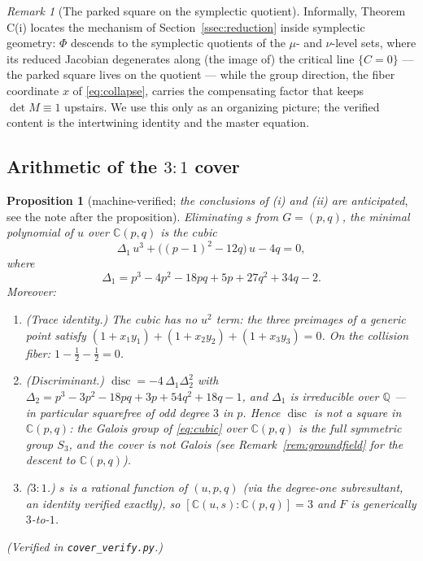 \documentclass[11pt]{amsart}
\newcommand{\CC}{\mathbb{C}}
\newcommand{\QQ}{\mathbb{Q}}
\newcommand{\disc}{\operatorname{disc}}
\theoremstyle{plain}
\newtheorem{proposition}[theorem]{Proposition}
\theoremstyle{definition}
\theoremstyle{remark}
\newtheorem{remark}[theorem]{Remark}
\begin{document}
\begin{remark}[The parked square on the symplectic quotient]
Informally, Theorem C(i) locates the mechanism of
Section~\ref{ssec:reduction} inside symplectic geometry: $\Phi$ descends
to the symplectic quotients of the $\mu$- and $\nu$-level sets, where its
reduced Jacobian degenerates along (the image of) the critical line
$\{C=0\}$ --- the parked square lives on the quotient --- while the group
direction, the fiber coordinate $x$ of \eqref{eq:collapse}, carries the
compensating factor that keeps $\det M\equiv1$ upstairs. We use this only
as an organizing picture; the verified content is the intertwining
identity and the master equation.
\end{remark}

\subsection{Arithmetic of the $3{:}1$ cover}\label{ssec:cover}

\begin{proposition}[machine-verified; \emph{the conclusions of (i) and
(ii) are anticipated}, see the note after the proposition]\label{prop:cover}
Eliminating $s$ from $G=(p,q)$, the minimal polynomial of $u$ over
$\CC(p,q)$ is the cubic
\begin{equation}\label{eq:cubic}
\Delta_{1}\,u^{3}+\bigl((p-1)^{2}-12q\bigr)\,u-4q=0,
\end{equation}
where
\[
\Delta_{1}=p^{3}-4p^{2}-18pq+5p+27q^{2}+34q-2 .
\]
Moreover:
\begin{enumerate}
\item[(i)] (Trace identity.) The cubic has no $u^{2}$ term: the three
preimages of a generic point satisfy
$(1+x_{1}y_{1})+(1+x_{2}y_{2})+(1+x_{3}y_{3})=0$. On the collision fiber:
$1-\tfrac12-\tfrac12=0$.
\item[(ii)] (Discriminant.) $\disc=-4\,\Delta_{1}\Delta_{2}^{2}$ with
$\Delta_{2}=p^{3}-3p^{2}-18pq+3p+54q^{2}+18q-1$, and $\Delta_{1}$ is
irreducible over $\QQ$ --- in particular squarefree of odd degree $3$ in
$p$. Hence $\disc$ is not a square in $\CC(p,q)$: the Galois group of
\eqref{eq:cubic} over $\CC(p,q)$ is the full symmetric group $S_{3}$, and
the cover is not Galois (see Remark~\ref{rem:groundfield} for the descent
to $\CC(p,q)$).
\item[(iii)] ($3{:}1$.) $s$ is a rational function of $(u,p,q)$ (via the
degree-one subresultant, an identity verified exactly), so
$[\CC(u,s):\CC(p,q)]=3$ and $F$ is generically $3$-to-$1$.
\end{enumerate}
\emph{(Verified in \texttt{cover\_verify.py}.)}
\end{proposition}
\end{document}
